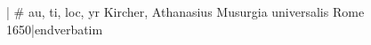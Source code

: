 

\verbatim| # au, ti, loc, yr
Kircher, Athanasius
Musurgia universalis
Rome
1650|endverbatim

\bye
